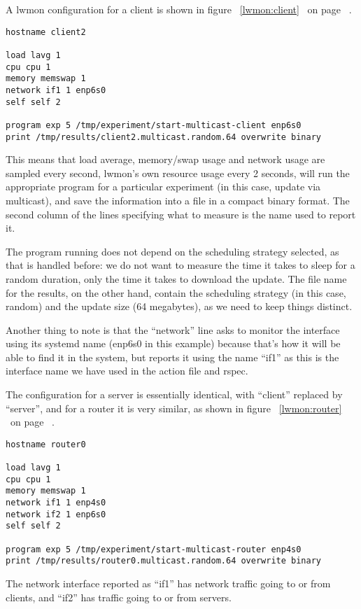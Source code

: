 \documentclass[a4paper,11pt,twocolumn]{article}
\newcommand{\pref}[1]{%
\ref{#1}%
\ifnum\thepage=0\pageref{#1}\else\ on page~\pageref{#1}\fi%
}
\begin{document}
A lwmon configuration for a client is shown in figure~\pref{lwmon:client}.
\begin{figure*}[bp]
\begin{verbatim}
hostname client2

load lavg 1
cpu cpu 1
memory memswap 1
network if1 1 enp6s0
self self 2

program exp 5 /tmp/experiment/start-multicast-client enp6s0
print /tmp/results/client2.multicast.random.64 overwrite binary
\end{verbatim}
\caption{lwmon client configuration}
\label{lwmon:client}
\end{figure*}
This means that load average, memory/swap usage and network usage are
sampled every second, lwmon's own resource usage every 2 seconds, will
run the appropriate program for a particular experiment (in this case,
update via multicast), and save the information into a file in a compact
binary format. The second column of the lines specifying what to measure
is the name used to report it.

The program running does not depend on the scheduling strategy selected,
as that is handled before: we do not want to measure the time it takes
to sleep for a random duration, only the time it takes to download the
update.  The file name for the results, on the other hand, contain the
scheduling strategy (in this case, random) and the update size (64
megabytes), as we need to keep things distinct.

Another thing to note is that the ``network'' line asks to monitor
the interface using its systemd name (enp6s0 in this example) because
that's how it will be able to find it in the system, but reports it
using the name ``if1'' as this is the interface name we have used
in the action file and rspec.

The configuration for a server is essentially identical, with ``client''
replaced by ``server'', and for a router it is very similar, as shown
in figure~\pref{lwmon:router}.
\begin{figure*}[bp]
\begin{verbatim}
hostname router0

load lavg 1
cpu cpu 1
memory memswap 1
network if1 1 enp4s0
network if2 1 enp6s0
self self 2

program exp 5 /tmp/experiment/start-multicast-router enp4s0
print /tmp/results/router0.multicast.random.64 overwrite binary
\end{verbatim}
\caption{lwmon router configuration}
\label{lwmon:router}
\end{figure*}
The network interface reported as ``if1'' has network traffic going
to or from clients, and ``if2'' has traffic going to or from servers.
\end{document}
